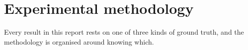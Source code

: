\chapter{Experimental methodology}
\label{ch:method}

Every result in this report rests on one of three kinds of ground truth, and
the methodology is organised around knowing which.




